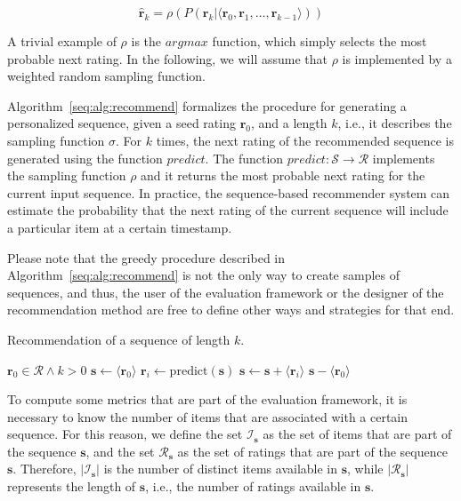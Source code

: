 \begin{equation}
\mathbf{\hat{r}}_{k} = \rho(P(\mathbf{r}_{k} | \langle \mathbf{r}_0, \mathbf{r}_1, \dotsc, \mathbf{r}_{k - 1} \rangle))
\end{equation}

A trivial example of $\rho$ is the $argmax$ function, which simply selects the most probable next rating. In the following, we will assume that $\rho$ is implemented by a weighted random sampling function.

Algorithm~\ref{seq:alg:recommend} formalizes the procedure for generating a personalized sequence, given a seed rating $\mathbf{r}_0$, and a length $k$, i.e., it describes the sampling function $\sigma$. For $k$ times, the next rating of the recommended sequence is generated using the function $predict$. The function $predict : \mathcal{S} \to \mathcal{R}$ implements the sampling function $\rho$ and it returns the most probable next rating for the current input sequence. In practice, the sequence-based recommender system can estimate the probability that the next rating of the current sequence will include a particular item at a certain timestamp.

Please note that the greedy procedure described in Algorithm~\ref{seq:alg:recommend} is not the only way to create samples of sequences, and thus, the user of the evaluation framework or the designer of the recommendation method are free to define other ways and strategies for that end. 

\begin{algorithm}
\caption{Recommendation of a sequence of length $k$.}
\label{seq:alg:recommend}
\begin{algorithmic}[1]
\REQUIRE $\mathbf{r}_0 \in \mathcal{R} \land k > 0$
\STATE $\mathbf{s} \gets \langle \mathbf{r}_0 \rangle$
\STATE $\mathbf{r}_i \gets \mathrm{predict}(\mathbf{s})$
\STATE $\mathbf{s} \gets \mathbf{s} + \langle \mathbf{r}_i \rangle$
\ENDFOR
\RETURN $\mathbf{s} - \langle \mathbf{r}_0 \rangle$
\end{algorithmic}
\end{algorithm}

To compute some metrics that are part of the evaluation framework, it is necessary to know the number of items that are associated with a certain sequence. For this reason, we define the set $\mathcal{I}_{\mathbf{s}}$ as the set of items that are part of the sequence $\mathbf{s}$, and the set $\mathcal{R}_{\mathbf{s}}$ as the set of ratings that are part of the sequence $\mathbf{s}$. Therefore, $|\mathcal{I}_{\mathbf{s}}|$ is the number of distinct items available in $\mathbf{s}$, while $|\mathcal{R}_{\mathbf{s}}|$ represents the length of $\mathbf{s}$, i.e., the number of ratings available in $\mathbf{s}$.

